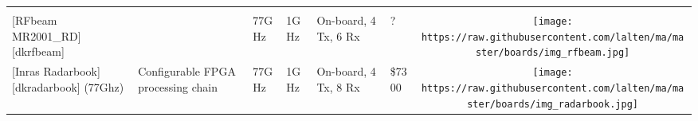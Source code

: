 \begin{longtable}[]{@{}llllllc@{}}
\begin{minipage}[t]{0.10\columnwidth}
\end{minipage}\tabularnewline
\begin{minipage}[t]{0.09\columnwidth}\raggedright\strut
{[}RFbeam MR2001\_RD{]}{[}dkrfbeam{]}\strut
\end{minipage} & \begin{minipage}[t]{0.13\columnwidth}\raggedright\strut
\strut
\end{minipage} & \begin{minipage}[t]{0.09\columnwidth}\raggedright\strut
77GHz\strut
\end{minipage} & \begin{minipage}[t]{0.11\columnwidth}\raggedright\strut
1GHz\strut
\end{minipage} & \begin{minipage}[t]{0.10\columnwidth}\raggedright\strut
On-board, 4 Tx, 6 Rx\strut
\end{minipage} & \begin{minipage}[t]{0.15\columnwidth}\raggedright\strut
?\strut
\end{minipage} & \begin{minipage}[t]{0.10\columnwidth}\centering\strut
\texttt{[image: https://raw.githubusercontent.com/lalten/ma/master/boards/img\_rfbeam.jpg]}\strut
\end{minipage}\tabularnewline
\begin{minipage}[t]{0.09\columnwidth}\raggedright\strut
{[}Inras Radarbook{]}{[}dkradarbook{]} (77Ghz)\strut
\end{minipage} & \begin{minipage}[t]{0.13\columnwidth}\raggedright\strut
Configurable FPGA processing chain\strut
\end{minipage} & \begin{minipage}[t]{0.09\columnwidth}\raggedright\strut
77GHz\strut
\end{minipage} & \begin{minipage}[t]{0.11\columnwidth}\raggedright\strut
1GHz\strut
\end{minipage} & \begin{minipage}[t]{0.10\columnwidth}\raggedright\strut
On-board, 4 Tx, 8 Rx\strut
\end{minipage} & \begin{minipage}[t]{0.15\columnwidth}\raggedright\strut
\$7300\strut
\end{minipage} & \begin{minipage}[t]{0.10\columnwidth}\centering\strut
\texttt{[image: https://raw.githubusercontent.com/lalten/ma/master/boards/img\_radarbook.jpg]}\strut

\end{minipage}
\end{longtable}
